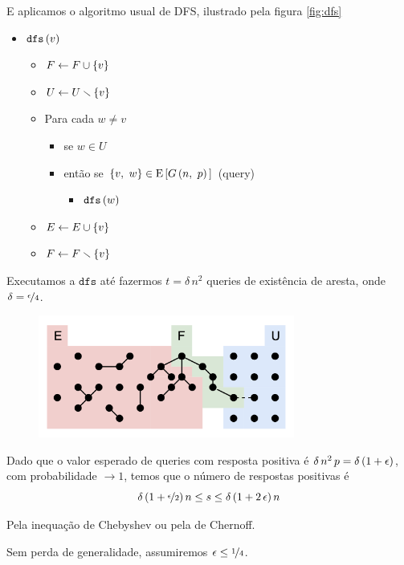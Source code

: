 E aplicamos o algoritmo usual de DFS, ilustrado pela figura \autoref{fig:dfs}
\begin{itemize}[label={}]
  \item $\texttt{dfs}\left(v\vphantom{1j}\right)$
  \begin{itemize}[label={}]
    \item $F\leftarrow F\cup\left\{v\vphantom{1j}\right\}$
    \item $U\leftarrow U\setminus\left\{v\vphantom{1j}\right\}$
    \item Para cada $w\neq v$
    \begin{itemize}[label={}]
      \item se $w\in U$
      \item então se $\left\{v,\ w\vphantom{1j}\right\}\in\mathrm{E}\left[G\left(n,\ p\vphantom{1j}\right)\vphantom{1j}\right]$ (query)
      \begin{itemize}[label={}]
        \item $\texttt{dfs}\left(w\vphantom{1j}\right)$
      \end{itemize}
    \end{itemize}
    \item $E\leftarrow E\cup\left\{v\vphantom{1j}\right\}$
    \item $F\leftarrow F\setminus\left\{v\vphantom{1j}\right\}$
  \end{itemize}
\end{itemize}

Executamos a $\texttt{dfs}$ até fazermos $t=\delta\,n^2$ queries de existência de aresta, onde $\delta=\nicefrac{\epsilon}{4}$.

\begin{figure}
  \label{fig:dfs}
  \includegraphics[width=0.75\textwidth]{aulas/10_17/dfs.png}
\end{figure}

\begin{observacao}
  Dado que o valor esperado de queries com resposta positiva é $\delta\,n^2\,p=\delta\left(1+\epsilon\vphantom{1j}\right)$, com probabilidade $\rightarrow1$, temos que o número de respostas positivas é
  \[
    \delta\left(1+\nicefrac{\epsilon}{2}\vphantom{1j}\right)n \leq s \leq \delta\left(1+2\,\epsilon\vphantom{1j}\right)n
  \]
  
  Pela inequação de Chebyshev ou pela de Chernoff.
  
  Sem perda de generalidade, assumiremos $\epsilon\leq\nicefrac{1}{4}$.
\end{observacao}

